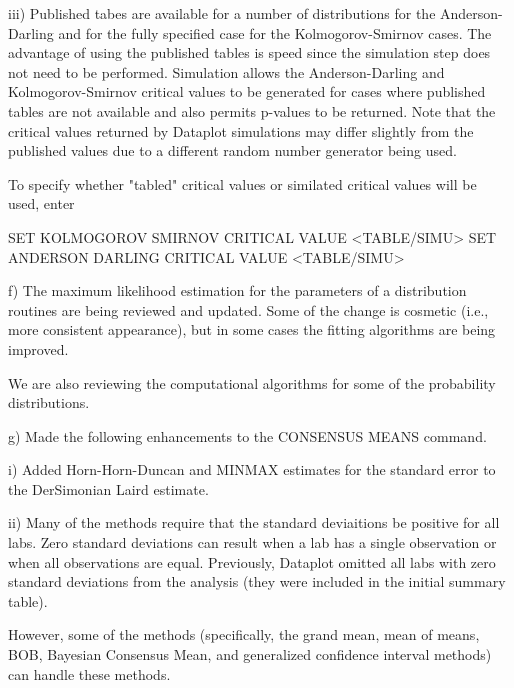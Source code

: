 {        iii) Published tabes are available for a number of
             distributions for the Anderson-Darling and for
             the fully specified case for the Kolmogorov-Smirnov
             cases.  The advantage of using the published tables
             is speed since the simulation step does not need to
             be performed.  Simulation allows the Anderson-Darling
             and Kolmogorov-Smirnov critical values to be generated
             for cases where published tables are not available and
             also permits p-values to be returned.  Note that the
             critical values returned by Dataplot simulations may
             differ slightly from the published values due to a
             different random number generator being used.

             To specify whether "tabled" critical values or
             similated critical values will be used, enter

                 SET KOLMOGOROV SMIRNOV CRITICAL VALUE <TABLE/SIMU>
                 SET ANDERSON DARLING CRITICAL VALUE <TABLE/SIMU>

    f) The maximum likelihood estimation for the parameters
       of a distribution routines are being reviewed and updated.
       Some of the change is cosmetic (i.e., more consistent
       appearance), but in some cases the fitting algorithms are
       being improved.

       We are also reviewing the computational algorithms for some
       of the probability distributions.

    g) Made the following enhancements to the CONSENSUS MEANS command.

          i) Added Horn-Horn-Duncan and MINMAX estimates for the standard
             error to the DerSimonian Laird estimate.

         ii) Many of the methods require that the standard deviaitions
             be positive for all labs.  Zero standard deviations can
             result when a lab has a single observation or when all
             observations are equal.  Previously, Dataplot omitted
             all labs with zero standard deviations from the analysis
             (they were included in the initial summary table).

             However, some of the methods (specifically, the grand mean,
             mean of means, BOB, Bayesian Consensus Mean, and generalized
             confidence interval methods) can handle these methods.

}
